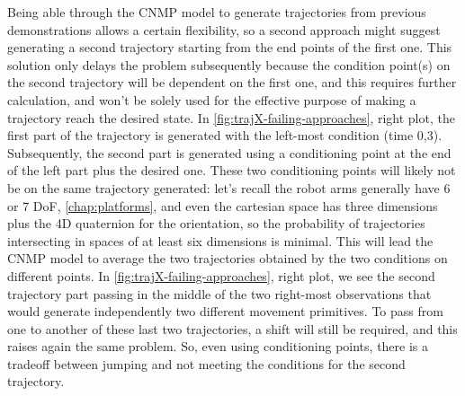 Being able through the CNMP model to generate trajectories from previous demonstrations allows a certain flexibility, so a second approach might suggest generating a second trajectory starting from the end points of the first one. This solution only delays the problem subsequently because the condition point(s) on the second trajectory will be dependent on the first one, and this requires further calculation, and won't be solely used for the effective purpose of making a trajectory reach the desired state. In \cref{fig:trajX-failing-approaches}, right plot, the first part of the trajectory is generated with the left-most condition (time 0,3). Subsequently, the second part is generated using a conditioning point at the end of the left part plus the desired one. These two conditioning points will likely not be on the same trajectory generated: let's recall the robot arms generally have 6 or 7 DoF, \cref{chap:platforms}, and even the cartesian space has three dimensions plus the 4D quaternion for the orientation, so the probability of trajectories intersecting in spaces of at least six dimensions is minimal. This will lead the CNMP model to average the two trajectories obtained by the two conditions on different points. In \cref{fig:trajX-failing-approaches}, right plot, we see the second trajectory part passing in the middle of the two right-most observations that would generate independently two different movement primitives. To pass from one to another of these last two trajectories, a shift will still be required, and this raises again the same problem. 
So, even using conditioning points, there is a tradeoff between jumping and not meeting the conditions for the second trajectory.

